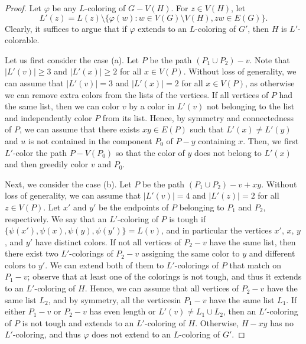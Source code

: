 \documentclass[12pt,twoside,openright,a4paper]{book}
\begin{document}
\begin{proof}
Let $\varphi$ be any $L$-coloring of $G-V(H)$.  For $z\in V(H)$, let
$$L'(z)=L(z)\setminus \{\varphi(w):w\in V(G)\setminus V(H), zw\in E(G)\}.$$
Clearly, it suffices to argue that if $\varphi$ extends to an $L$-coloring of $G'$, then $H$ is $L'$-colorable.

Let us first consider the case (a).  Let $P$ be the path $(P_1\cup P_2)-v$.  Note that $|L'(v)|\ge 3$ and $|L'(x)|\ge 2$ for all $x\in V(P)$.
Without loss of generality, we can assume that $|L'(v)|=3$ and $|L'(x)|=2$ for all $x\in V(P)$, as otherwise
we can remove extra colors from the lists of the vertices.  If all vertices of $P$ had the same list, then we can color $v$ by a color in $L'(v)$
not belonging to the list and independently color $P$ from its list.  Hence, by symmetry and connectedness of $P$, we can assume that there
exists $xy\in E(P)$ such that $L'(x)\neq L'(y)$ and $u$ is not contained in the component $P_0$ of $P-y$ containing $x$.  Then, we first
$L'$-color the path $P-V(P_0)$ so that the color of $y$ does not belong to $L'(x)$ and then greedily color $v$ and $P_0$.

Next, we consider the case (b).  Let $P$ be the path $(P_1\cup P_2)-v+xy$.  Without loss of generality, we can assume
that $|L'(v)|=4$ and $|L'(z)|=2$ for all $z\in V(P)$.  Let $x'$ and $y'$ be the endpoints of $P$
belonging to $P_1$ and $P_2$, respectively.  We say that an $L'$-coloring of $P$ is tough if $\{\psi(x'),\psi(x),\psi(y),\psi(y')\}=L(v)$,
and in particular the vertices $x'$, $x$, $y$, and $y'$ have distinct colors.
If not all vertices of $P_2-v$ have the same list, then there exist two $L'$-colorings of $P_2-v$ assigning the same color to $y$ and different colors to $y'$.
We can extend both of them to $L'$-colorings of $P$ that match on $P_1-v$; observe that at least one of the colorings is not tough, and thus it extends to an $L'$-coloring
of $H$.  Hence, we can assume that all vertices of $P_2-v$ have the same list $L_2$, and by symmetry, all the verticesin $P_1-v$ have the same list $L_1$.
If either $P_1-v$ or $P_2-v$ has even length or $L'(v)\neq L_1\cup L_2$, then an $L'$-coloring of $P$ is not tough and extends to an $L'$-coloring of $H$.
Otherwise, $H-xy$ has no $L'$-coloring, and thus $\varphi$ does not extend to an $L$-coloring of $G'$.
\end{proof}
\end{document}
